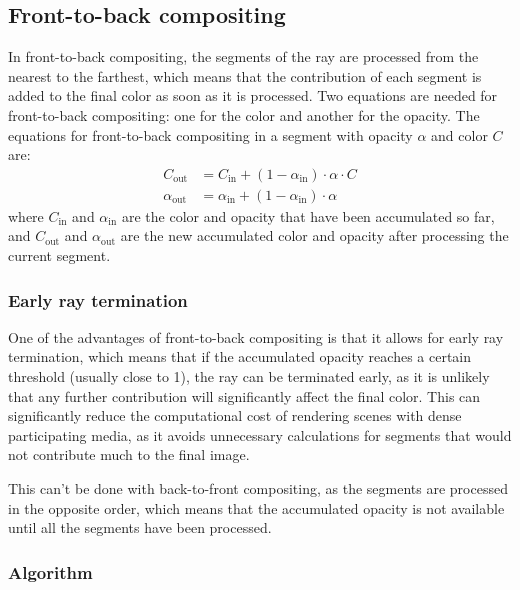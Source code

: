 \subsection{Front-to-back compositing}

In front-to-back compositing, the segments of the ray are processed from the nearest to the farthest, which means that the contribution of each segment is added to the final color as soon as it is processed. Two equations are needed for front-to-back compositing: one for the color and another for the opacity. The equations for front-to-back compositing in a segment with opacity $\alpha$ and color $C$ are:
\begin{align*}
C_{\text{out}} &= C_{\text{in}} + (1 - \alpha_{\text{in}}) \cdot \alpha \cdot C \\
\alpha_{\text{out}} &= \alpha_{\text{in}} + (1 - \alpha_{\text{in}}) \cdot \alpha
\end{align*}
where $C_{\text{in}}$ and $\alpha_{\text{in}}$ are the color and opacity that have been accumulated so far, and $C_{\text{out}}$ and $\alpha_{\text{out}}$ are the new accumulated color and opacity after processing the current segment.

\subsubsection{Early ray termination}
One of the advantages of front-to-back compositing is that it allows for early ray termination, which means that if the accumulated opacity reaches a certain threshold (usually close to 1), the ray can be terminated early, as it is unlikely that any further contribution will significantly affect the final color. This can significantly reduce the computational cost of rendering scenes with dense participating media, as it avoids unnecessary calculations for segments that would not contribute much to the final image.

This can't be done with back-to-front compositing, as the segments are processed in the opposite order, which means that the accumulated opacity is not available until all the segments have been processed.

\subsubsection{Algorithm}

